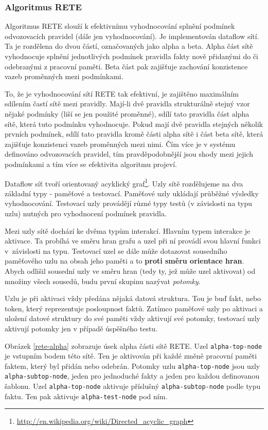 \subsubsection{Algoritmus RETE}
\label{rete}

Algoritmus RETE slouží k efektivnímu vyhodnocování splnění podmínek odvozovacích
pravidel (dále jen vyhodnocování). Je implementován dataflow sítí. Ta je
rozdělena do dvou částí, označovaných jako alpha a beta. Alpha část sítě
vyhodnocuje splnění jednotlivých podmínek pravidla fakty nově přidanými do či
odebranými z pracovní paměti. Beta část pak zajišťuje zachování konzistence
vazeb proměnných mezi podmínkami.

To, že je vyhodnocování sítí RETE tak efektivní, je zajištěno maximálním
sdílením častí sítě mezi pravidly. Mají-li dvě pravidla strukturálně stejný vzor
nějaké podmínky (liší se jen použité proměnné), sdílí tato pravidla část alpha
sítě, která tuto podmínku vyhodnocuje. Pokud mají dvě pravidla stejných několik
prvních podmínek, sdílí tato pravidla kromě části alpha sítě i část beta sítě,
která zajišťuje konzistenci vazeb proměnných mezi nimi. Čím více je v systému
definováno odvozovacích pravidel, tím pravděpodobnější jsou shody mezi jejich
podmínkami a tím více se efektivita algoritmu projeví.

Dataflow síť tvoří orientovaný acyklický
graf\footnote{\url{http://en.wikipedia.org/wiki/Directed\_acyclic\_graph}}. Uzly
sítě rozdělujeme na dva základní typy - paměťové a testovací. Paměťové uzly
ukládají průběžné výsledky vyhodnocování. Testovací uzly provádějí různé typy
testů (v závislosti na typu uzlu) nutných pro vyhodnocení podmínek pravidla.

Mezi uzly sítě dochází ke dvěma typům interakcí. Hlavním typem interakce je
aktivace. Ta probíhá ve směru hran grafu a uzel při ní provádí svou hlavní
funkci v~závislosti na typu. Testovací uzel se dále může dotazovat sousedního
paměťového uzlu na obsah jeho paměti a to \textbf{proti směru orientace hran}.
Abych odlišil sousední uzly ve směru hran (tedy ty, jež může uzel aktivovat) od
množiny všech sousedů, budu první skupinu nazývat \emph{potomky}.

Uzlu je při aktivaci vždy předána nějaká datová struktura. Tou je buď fakt, nebo
token, který reprezentuje posloupnost faktů. Zatímco paměťové uzly po aktivaci a
uložení datové struktury do své paměti vždy aktivují své potomky, testovací uzly
aktivují potomky jen v případě úspěšného testu.

Obrázek \ref{rete-alpha} zobrazuje úsek alpha části sítě RETE. Uzel
\verb|alpha-top-node| je vstupním bodem této sítě. Ten je aktivován při každé
změně pracovní paměti faktem, který byl přidán nebo odebrán. Potomky uzlu
\verb|alpha-top-node| jsou uzly \verb|alpha-subtop-node|, jeden pro jednoduché fakty
a jeden pro každou definovanou šablonu. Uzel \verb|alpha-top-node| aktivuje příslušný
\verb|alpha-subtop-node| podle typu faktu. Ten pak aktivuje
\verb|alpha-test-node| pod ním.

